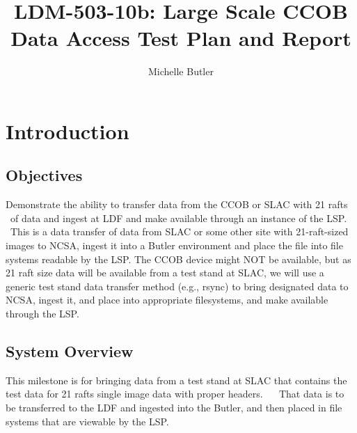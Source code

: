 \documentclass[DM,lsstdraft,STR,toc]{lsstdoc}
\begin{document}
\def\milestoneName{Large Scale Data Access CCOB data}
\def\milestoneId{LDM-503-10b}
\def\product{DBB Services}


\title{LDM-503-10b: Large Scale CCOB Data Access Test Plan and Report}
\setDocRef{\lsstDocType-\lsstDocNum}
\date{\vcsdate}
\author{ Michelle Butler }






\maketitle

\section{Introduction}
\label{sect:intro}


\subsection{Objectives}
\label{sect:objectives}

 Demonstrate the ability to transfer data from the CCOB or SLAC with 21
rafts ~of data and ingest at LDF and make available through an instance
of the LSP. ~This is a data transfer of data from SLAC or some other
site with 21-raft-sized images to NCSA, ingest it into a Butler
environment and place the file into file systems readable by the LSP.
The CCOB device might NOT be available, but as 21 raft size data will be
available from a test stand at SLAC, we will use a generic test stand
data transfer method (e.g., rsync) to bring designated data to NCSA,
ingest it, and place into appropriate filesystems, and make available
through the LSP.



\subsection{System Overview}
\label{sect:systemoverview}

 This milestone is for bringing data from a test stand at SLAC that
contains the test data for 21 rafts single image data with proper
headers. ~ ~That data is to be transferred to the LDF and ingested into
the Butler, and then placed in file systems that are viewable by the
LSP. ~\\[2\baselineskip]
\end{document}

